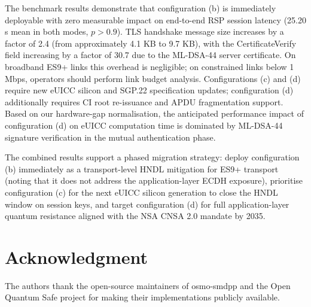 \documentclass[a4paper,fleqn]{cas-sc}
\begin{document}
The benchmark results demonstrate that configuration (b) is immediately
deployable with zero measurable impact on end-to-end RSP session latency
(25.20 s mean in both modes, $p > 0.9$). TLS handshake message size
increases by a factor of 2.4 (from approximately 4.1 KB to 9.7 KB),
with the CertificateVerify field increasing by a factor of 30.7 due to
the ML-DSA-44 server certificate. On broadband ES9+ links this overhead
is negligible; on constrained links below 1 Mbps, operators should
perform link budget analysis. Configurations (c) and (d) require new
eUICC silicon and SGP.22 specification updates; configuration (d)
additionally requires CI root re-issuance and APDU fragmentation support.
Based on our hardware-gap normalisation, the anticipated performance
impact of configuration (d) on eUICC computation time is dominated by
ML-DSA-44 signature verification in the mutual authentication phase.

The combined results support a phased migration strategy: deploy
configuration (b) immediately as a transport-level HNDL mitigation for
ES9+ transport (noting that it does not address the application-layer
ECDH exposure), prioritise configuration (c) for the next eUICC silicon
generation to close the HNDL window on session keys, and target
configuration (d) for full application-layer quantum resistance aligned
with the NSA CNSA 2.0 mandate by 2035.

\section*{Acknowledgment}
The authors thank the open-source maintainers of osmo-smdpp and the Open
Quantum Safe project for making their implementations publicly available.

\clearpage


\end{document}
